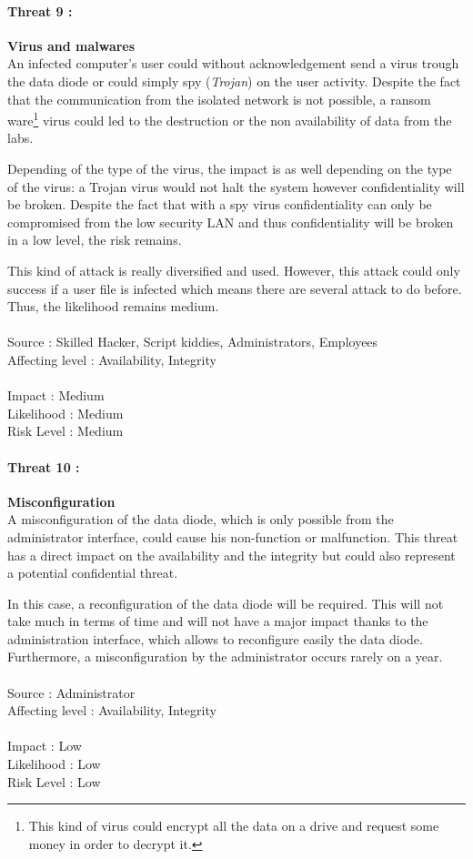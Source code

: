 \documentclass[a4paper,10pt]{article}
\begin{document}
\paragraph{Threat 9 :}  \textbf{Virus and malwares} \\
\indent An infected computer's user could without acknowledgement send a virus trough the data diode or could simply spy (\emph{Trojan}) on the user activity. Despite the fact that the communication from the isolated network is not possible, a ransom ware\footnote{This kind of virus could encrypt all the data on a drive and request some money in order to decrypt it.} virus could led to the destruction or the non availability of data from the labs.

Depending of the type of the virus, the impact is as well depending on the type of the virus: a Trojan virus would not halt the system however confidentiality will be broken. Despite the fact that with a spy virus confidentiality can only be compromised from the low security LAN and thus confidentiality will be broken in a low level, the risk remains.

This kind of attack is really diversified and used. However, this attack could only success if a user file is infected which means there are several attack to do before. Thus, the likelihood remains medium. \\ \\
Source : Skilled Hacker, Script kiddies, Administrators, Employees  \\ 
Affecting level : Availability, Integrity \\ \\
Impact : Medium \\
Likelihood : Medium \\
Risk Level : Medium

\paragraph{Threat 10 :}  \textbf{Misconfiguration} \\
\indent A misconfiguration of the data diode, which is only possible from the administrator interface, could cause his non-function or malfunction. This threat has a direct impact on the availability and the integrity but could also represent a potential confidential threat.

In this case, a reconfiguration of the data diode will be required. This will not take much in terms of time and will not have a major impact thanks to the administration interface, which allows to reconfigure easily the data diode. Furthermore, a misconfiguration by the administrator occurs rarely on a year.\\ \\ 
Source : Administrator \\ 
Affecting level : Availability, Integrity \\ \\
Impact : Low \\
Likelihood : Low \\
Risk Level : Low
\end{document}
